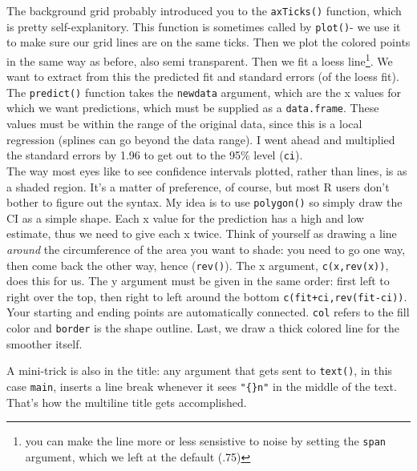 \documentclass[a4paper]{article}
\begin{document}
The background grid probably introduced you to the \texttt{axTicks()} function, which is pretty self-explanitory. This function is sometimes called by \texttt{plot()}- we use it to make sure our grid lines are on the same ticks. Then we plot the colored points in the same way as before, also semi transparent. Then we fit a loess line\footnote{you can make the line more or less sensistive to noise by setting the \texttt{span} argument, which we left at the default (.75)}. We want to extract from this the predicted fit and standard errors (of the loess fit). The \texttt{predict()} function takes the \texttt{newdata} argument, which are the x values for which we want predictions, which must be supplied as a \texttt{data.frame}. These values must be within the range of the original data, since this is a local regression (splines can go beyond the data range). I went ahead and multiplied the standard errors by 1.96 to get out to the 95\% level (\texttt{ci}).\\

The way most eyes like to see confidence intervals plotted, rather than lines, is as a shaded region. It's a matter of preference, of course, but most R users don't bother to figure out the syntax. My idea is to use \texttt{polygon()} so simply draw the CI as a simple shape. Each x value for the prediction has a high and low estimate, thus we need to give each x twice.  Think of yourself as drawing a line \textit{around} the circumference of the area you want to shade: you need to go one way, then come back the other way, hence (\texttt{rev()}). The x argument, \texttt{c(x,rev(x))}, does this for us. The y argument must be given in the same order: first left to right over the top, then right to left around the bottom \texttt{c(fit+ci,rev(fit-ci))}. Your starting and ending points are automatically connected. \texttt{col} refers to the fill color and \texttt{border} is the shape outline. Last, we draw a thick colored line for the smoother itself.

A mini-trick is also in the title: any argument that gets sent to \texttt{text()}, in this case \texttt{main}, inserts a line break whenever it sees \texttt{"\{\}n"} in the middle of the text. That's how the multiline title gets accomplished.
\pagebreak
\end{document}
